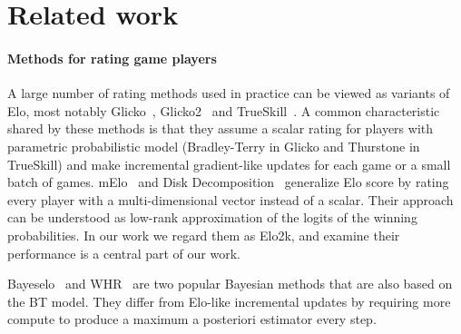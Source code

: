 \section{Related work}
\paragraph{Methods for rating game players} A large number of rating methods used in practice can be viewed as variants of Elo, most notably Glicko~\citep{glickman1995glicko}, Glicko2~\citep{glickman2012example} and TrueSkill~\citep{herbrich2006trueskill}. A common characteristic shared by these methods is that they assume a scalar rating for players with parametric probabilistic model (Bradley-Terry in Glicko and Thurstone in TrueSkill) and make incremental gradient-like updates for each game or a small batch of games. 
mElo~\citep{balduzzi2018re} and Disk Decomposition~\citep{bertrand2023limitations} generalize Elo score by rating every player with a multi-dimensional vector instead of a scalar. Their approach can be understood as low-rank approximation of the logits of the winning probabilities. In our work we regard them as Elo2k, and examine their performance is a central part of our work.


Bayeselo~\citep{bayeselo} and WHR~\citep{coulom2008whole} are two popular Bayesian methods that are also based on the BT model. They differ from Elo-like incremental updates by requiring more compute to produce a maximum a posteriori estimator every step. 



